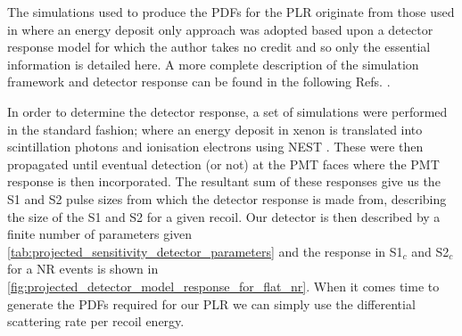 The simulations used to produce the PDFs for the PLR originate from those used in \cite{LZ_projected_sensitivity_paper_ref} where an energy deposit only approach was adopted based upon a detector response model for which the author takes no credit and so only the essential information is detailed here.
A more complete description of the simulation framework and detector response can be found in the following Refs. \cite{lz_simulations_ref,theresafruth_thesis_ref}.
\par
In order to determine the detector response, a set of simulations were performed in the standard fashion; where an energy deposit in xenon is translated into scintillation photons and ionisation electrons using NEST \cite{nest_1_ref,nest_2_ref}.
These were then propagated until eventual detection (or not) at the PMT faces where the PMT response is then incorporated.
The resultant sum of these responses give us the S1 and S2 pulse sizes from which the detector response is made from, describing the size of the S1 and S2 for a given recoil.
Our detector is then described by a finite number of parameters given \autoref{tab:projected_sensitivity_detector_parameters} and the response in S1$_c$ and S2$_c$ for a NR events is shown in \autoref{fig:projected_detector_model_response_for_flat_nr}.
When it comes time to generate the PDFs required for our PLR we can simply use the differential scattering rate per recoil energy.